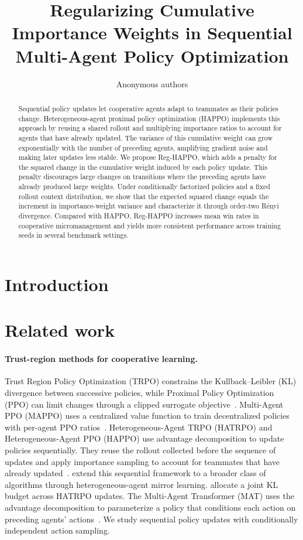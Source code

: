 \documentclass{article}
\title{Regularizing Cumulative Importance Weights in Sequential Multi-Agent Policy Optimization}
\author{Anonymous authors}
\begin{document}
\maketitle

\begin{abstract}
Sequential policy updates let cooperative agents adapt to teammates as their policies change. Heterogeneous-agent proximal policy optimization (HAPPO) implements this approach by reusing a shared rollout and multiplying importance ratios to account for agents that have already updated. The variance of this cumulative weight can grow exponentially with the number of preceding agents, amplifying gradient noise and making later updates less stable. We propose Reg-HAPPO, which adds a penalty for the squared change in the cumulative weight induced by each policy update. This penalty discourages large changes on transitions where the preceding agents have already produced large weights. Under conditionally factorized policies and a fixed rollout context distribution, we show that the expected squared change equals the increment in importance-weight variance and characterize it through order-two R\'enyi divergence. Compared with HAPPO, Reg-HAPPO increases mean win rates in cooperative micromanagement and yields more consistent performance across training seeds in several benchmark settings.
\end{abstract}

\section{Introduction}

\section{Related work}

\paragraph{Trust-region methods for cooperative learning.}
Trust Region Policy Optimization (TRPO) constrains the Kullback--Leibler (KL) divergence between successive policies, while Proximal Policy Optimization (PPO) can limit changes through a clipped surrogate objective~\citep{schulman2015,schulman2017}. Multi-Agent PPO (MAPPO) uses a centralized value function to train decentralized policies with per-agent PPO ratios~\citep{yu2022}. Heterogeneous-Agent TRPO (HATRPO) and Heterogeneous-Agent PPO (HAPPO) use advantage decomposition to update policies sequentially. They reuse the rollout collected before the sequence of updates and apply importance sampling to account for teammates that have already updated~\citep{kuba2022}. \citet{zhong2024} extend this sequential framework to a broader class of algorithms through heterogeneous-agent mirror learning. \citet{shek2026} allocate a joint KL budget across HATRPO updates. The Multi-Agent Transformer (MAT) uses the advantage decomposition to parameterize a policy that conditions each action on preceding agents' actions~\citep{wen2022}. We study sequential policy updates with conditionally independent action sampling.
\end{document}
